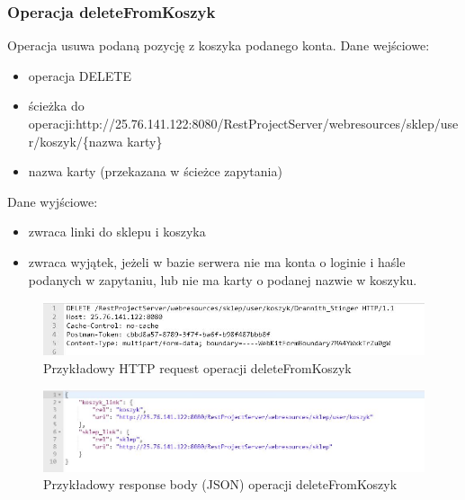 \documentclass[11pt]{article}   %
\begin{document}
\subsubsection{Operacja deleteFromKoszyk}
Operacja usuwa podaną pozycję z koszyka podanego konta.\newline
Dane wejściowe:
\begin{itemize}
	\item operacja DELETE
	\item ścieżka do operacji:\newline http://25.76.141.122:8080/RestProjectServer/webresources/sklep/user/koszyk/\{nazwa karty\}
	\item nazwa karty (przekazana w ścieżce zapytania)

\end{itemize}	
Dane wyjściowe:
\begin{itemize}
	\item zwraca linki do sklepu i koszyka
	\item zwraca wyjątek, jeżeli w bazie serwera nie ma konta o loginie i haśle podanych w zapytaniu, lub nie ma karty o podanej nazwie w koszyku.
\end{itemize}
\begin{figure}[H]
	\centering
	\includegraphics[width=0.8\linewidth]{komunikaty_zdjecia_rest/deleteFromKoszyk_req}
	\caption{Przykładowy HTTP request operacji deleteFromKoszyk}
	\label{zrzut71}
\end{figure}
\begin{figure}[H]
	\centering
	\includegraphics[width=0.8\linewidth]{komunikaty_zdjecia_rest/deleteFromKoszyk_res_body}
	\caption{Przykładowy response body (JSON) operacji deleteFromKoszyk}
	\label{zrzut72}
\end{figure}
\end{document}
